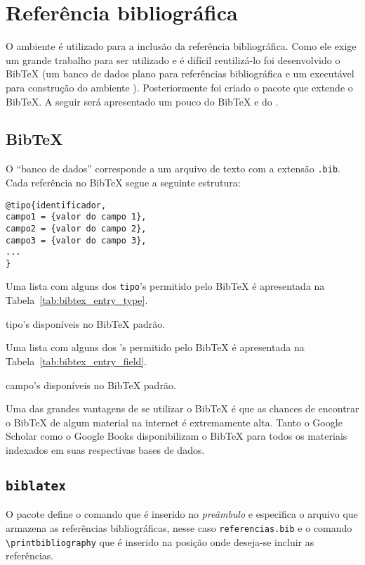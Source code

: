 \chapter{Referência bibliográfica}
O ambiente  é utilizado para a inclusão da referência
bibliográfica. Como ele exige um grande trabalho para ser utilizado e é difícil
reutilizá-lo foi desenvolvido o BibTeX (um banco de dados plano para referências
bibliográfica e um executável para construção do ambiente
). Posteriormente foi criado o pacote
 que extende o BibTeX. A seguir será apresentado um pouco do
BibTeX e do .

\section{BibTeX}
O ``banco de dados'' corresponde a um arquivo de texto com a extensão
\lstinline+.bib+. Cada referência no BibTeX segue a seguinte estrutura:
\begin{lstlisting}
@tipo{identificador,
campo1 = {valor do campo 1},
campo2 = {valor do campo 2},
campo3 = {valor do campo 3},
...
}
\end{lstlisting}

Uma lista com alguns dos \lstinline+tipo+'s permitido pelo BibTeX é
apresentada na Tabela~\ref{tab:bibtex_entry_type}.
\begin{table}[h!tb]
  \centering
  \caption{\textsf{tipo}'s disponíveis no BibTeX padrão.}
  \label{tab:bibtex_entry_type}
  
\end{table}

Uma lista com alguns dos 's permitido pelo BibTeX é apresentada na
Tabela~\ref{tab:bibtex_entry_field}.
\begin{table}[h!tb]
    \centering
    \caption{\textsf{campo}'s disponíveis no BibTeX padrão.}
    \label{tab:bibtex_entry_field}
    
\end{table}

Uma das grandes vantagens de se utilizar o BibTeX é que as chances de encontrar
o BibTeX de algum material na internet é extremamente alta. Tanto o Google
Scholar como o Google Books disponibilizam o BibTeX para todos os materiais
indexados em suas respectivas bases de dados.

\section{\lstinline+biblatex+}
O pacote  define o comando
\lstinline++ que é inserido no \emph{preâmbulo}
e especifica o arquivo que armazena as referências bibliográficas, nesse caso
\lstinline+referencias.bib+ e o comando \lstinline+\printbibliography+ que é
inserido na posição onde deseja-se incluir as referências.

